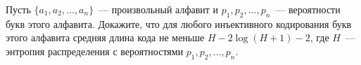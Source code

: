 Пусть $\{a_1, a_2, \dots, a_n\}$~--- произвольный алфавит и $p_1, p_2, \dots, p_n$~--- вероятности букв
этого алфавита. Докажите, что для любого инъективного кодирования букв этого алфавита средняя длина кода 
не меньше $H - 2 \log (H + 1) - 2$, где $H$~--- энтропия распределения с вероятностями $p_1, p_2, \dots, p_n$.

